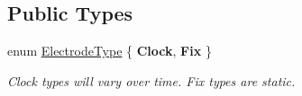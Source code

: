 \subsection*{Public Types}
\begin{DoxyCompactItemize}
\item 
enum \hyperlink{classprim_1_1Electrode_a6b0ec865c0415eb2d43089c8c10ed389}{Electrode\+Type} \{ {\bfseries Clock}, 
{\bfseries Fix}
 \}\hypertarget{classprim_1_1Electrode_a6b0ec865c0415eb2d43089c8c10ed389}{}\label{classprim_1_1Electrode_a6b0ec865c0415eb2d43089c8c10ed389}
\begin{DoxyCompactList}\small\item\em Clock types will vary over time. Fix types are static. \end{DoxyCompactList}
\end{DoxyCompactItemize}
